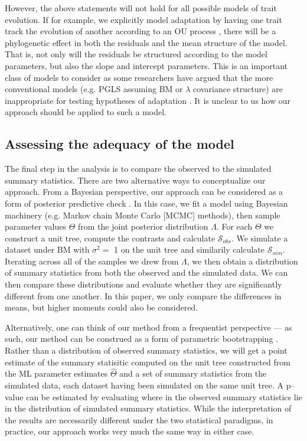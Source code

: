 \documentclass[a4paper,12pt]{article}
\begin{document}
However, the above statements will not hold for all possible models of trait evolution. If for example, we explicitly model adaptation by having one trait track the evolution of another according to an OU process \citep[see][]{Hansen2008, Bartoszek2012}, there will be a phylogenetic effect in both the residuals and the mean structure of the model. That is, not only will the residuals be structured according to the model parameters, but also the slope and intercept parameters. This is an important class of models to consider as some researchers have argued that the more conventional models (e.g. PGLS assuming BM or $\lambda$ covariance structure) are inappropriate for testing hypotheses of adaptation \citep{HansenOrzack2005, Hansen2012}. It is unclear to us how our approach should be applied to such a model.

\subsection{Assessing the adequacy of the model}
The final step in the analysis is to compare the observed to the simulated summary statistics. There are two alternative ways to conceptualize our approach. From a Bayesian perspective, our approach can be considered as a form of posterior predictive check \citep{Rubin1984, Gelman1996}. In this case, we fit a model using Bayesian machinery (e.g. Markov chain Monte Carlo [MCMC] methods), then sample parameter values $\Theta$ from the joint posterior distribution $\Lambda$. For each $\Theta$ we construct a unit tree, compute the contrasts and calculate $\mathcal{S}_{obs}$. We simulate a dataset under BM with $\sigma^2 =$ 1 on the unit tree and similarily calculate $\mathcal{S}_{sim}$. Iterating across all of the samples we drew from $\Lambda$, we then obtain a distribution of summary statistics from both the observed and the simulated data. We can then compare these distributions and evaluate whether they are significantly different from one another. In this paper, we only compare the differences in means, but higher moments could also be considered. 

Alternatively, one can think of our method from a frequentist perspective --- as such, our method can be construed as a form of parametric bootstrapping \citep{Efronbootstrap}. Rather than a distribution of observed summary statistics, we will get a point estimate of the summary statisitic computed on the unit tree constructed from the ML parameter estimates $\hat{\Theta}$ and a set of summary statistics from the simulated data, each dataset having been simulated on the same unit tree. A p--value can be estimated by evaluating where in the observed summary statistics lie in the distribution of simulated summary statistics. While the interpretation of the results are necessarily different under the two statistical paradigms, in practice, our approach works very much the same way in either case.
\end{document}
